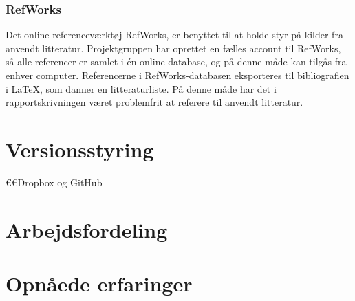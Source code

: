 	\subsubsection{RefWorks}
Det online referenceværktøj RefWorks, er benyttet til at holde styr på kilder fra anvendt litteratur. Projektgruppen har oprettet en fælles account til RefWorks, så alle referencer er samlet i én online database, og på denne måde kan tilgås fra enhver computer. Referencerne i RefWorks-databasen eksporteres til bibliografien i LaTeX, som danner en litteraturliste. På denne måde har det i rapportskrivningen været problemfrit at referere til anvendt litteratur.  
	
	



\section{Versionsstyring}
 	€€Dropbox og GitHub

\section{Arbejdsfordeling}

\section{Opnåede erfaringer}
 